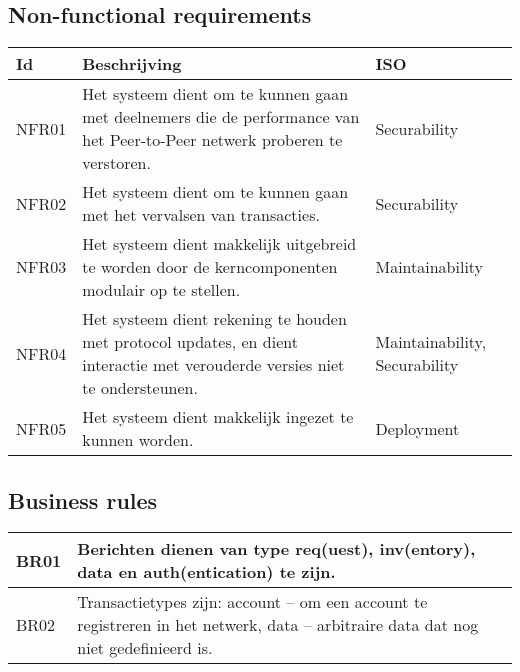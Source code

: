 \subsection{Non-functional requirements}

\begin{tabular}{|p{1.1cm}|p{8cm}|p{3cm}|}
  \hline
  \textbf{Id} & \textbf{Beschrijving} & \textbf{ISO} \\
  \hline
  NFR01 & Het systeem dient om te kunnen gaan met deelnemers die de performance van het Peer-to-Peer netwerk proberen te verstoren. & Securability \\
  \hline  
  NFR02 & Het systeem dient om te kunnen gaan met het vervalsen van transacties. & Securability \\
  \hline
  NFR03 & Het systeem dient makkelijk uitgebreid te worden door de kerncomponenten modulair op te stellen. & Maintainability \\
  \hline
  NFR04 & Het systeem dient rekening te houden met protocol updates, en dient interactie met verouderde versies niet te ondersteunen. & Maintainability, Securability \\ 
  \hline
  NFR05 & Het systeem dient makkelijk ingezet te kunnen worden. & Deployment \\
  \hline
\end{tabular}

\subsection{Business rules}
\begin{tabular}{|p{1.1cm}|p{11cm}|}
  \hline
  BR01 & Berichten dienen van type req(uest), inv(entory), data en auth(entication) te zijn. \\
  \hline
  BR02 & Transactietypes zijn: account -- om een account te registreren in het netwerk, data -- arbitraire data dat nog niet gedefinieerd is. \\
  \hline
\end{tabular}